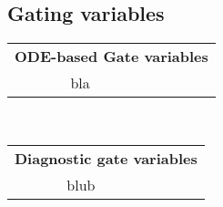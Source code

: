 \documentclass{scrartcl}
\begin{document}
\subsection{Gating variables}
\begin{table}[ht]
\begin{tabular}{cc}
\multicolumn{2}{c}{\bf ODE-based Gate variables}\\
bla
\end{tabular}\\
%
\begin{tabular}{cc}
\multicolumn{2}{c}{\bf Diagnostic gate variables}\\
blub
\end{tabular}
\end{table}
\end{document}
